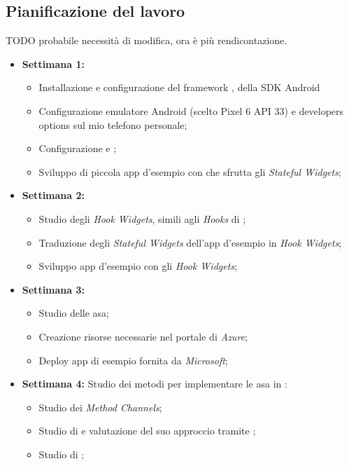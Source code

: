 \subsection{Pianificazione del lavoro}
TODO probabile necessità di modifica, ora è più rendicontazione.
\begin{itemize}
    \item \textbf{Settimana 1:} 
        \begin{itemize}
            \item Installazione e configurazione del framework \flutter, della SDK Android 
            \item Configurazione emulatore Android (scelto Pixel 6 API 33) e 
            developers options sul mio telefono personale;
            \item Configurazione \vsc e \astudio;
            \item Sviluppo di piccola app d'esempio con \flutter che sfrutta gli \textit{Stateful Widgets};
        \end{itemize} 
    \item \textbf{Settimana 2:} 
        \begin{itemize}
            \item Studio degli \textit{Hook Widgets}, simili agli \textit{Hooks} di ;
            \item Traduzione degli \textit{Stateful Widgets} dell'app d'esempio in \textit{Hook Widgets};
            \item Sviluppo app d'esempio con gli \textit{Hook Widgets};
        \end{itemize}
    \item \textbf{Settimana 3:} 
        \begin{itemize}
            \item Studio delle asa;
            \item Creazione risorse necessarie nel portale di \textit{Azure};
            \item Deploy app di esempio fornita da \textit{Microsoft};
        \end{itemize}
    \item \textbf{Settimana 4:} Studio dei metodi per implementare le asa in \flutter:
        \begin{itemize}
            \item Studio dei \textit{Method Channels};
            \item Studio di  e valutazione del suo approccio tramite \unity;
            \item Studio di \arplug;

\end{itemize}
\end{itemize}
